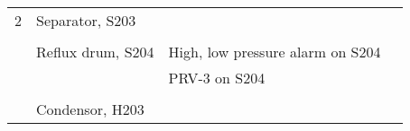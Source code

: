 \begin{table}[p]
\begin{tabularx}{\linewidth}{@{}l>{\raggedright}p{2cm}XX@{}}
2   & Separator, S203           &                                                                                                                                                               &                                                                                                                                                                                                              \\ \cmidrule(l){3-4} 
    &                           &                                                                                                                                                               &                                                                                                                                                                                                              \\ \cmidrule(l){2-4} 
    & Reflux drum, S204         & High, low pressure alarm on S204                                                                                                                              &                                                                                                                                                                                                              \\ \cmidrule(l){3-4} 
    &                           & PRV-3 on S204                                                                                                                                                 &                                                                                                                                                                                                              \\ \cmidrule(l){3-4} 
    &                           &                                                                                                                                                               &                                                                                                                                                                                                              \\ \cmidrule(l){2-4} 
    & Condensor, H203           &                                                                                                                                                               &                                                                                                                                                                                                              \\ \cmidrule(l){3-4} 

\end{tabularx}
\end{table}
